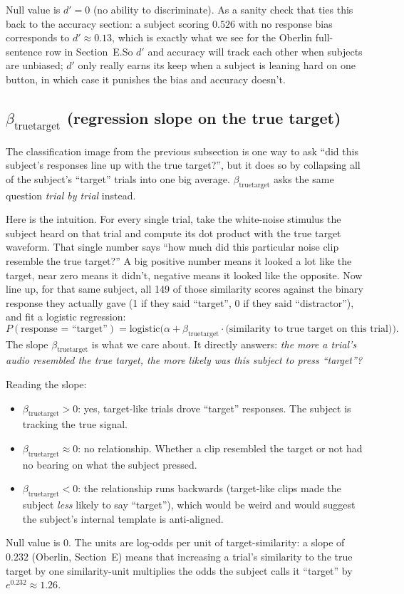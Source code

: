 \documentclass[11pt]{article}
\begin{document}
Null value is $d' = 0$ (no ability to discriminate). As a sanity check that ties this back to the accuracy section: a subject scoring $0.526$ with no response bias corresponds to $d' \approx 0.13$, which is exactly what we see for the Oberlin full-sentence row in Section~E.\@ So $d'$ and accuracy will track each other when subjects are unbiased; $d'$ only really earns its keep when a subject is leaning hard on one button, in which case it punishes the bias and accuracy doesn't.

\subsection{$\beta_{\text{truetarget}}$ (regression slope on the true target)}

The classification image from the previous subsection is one way to ask ``did this subject's responses line up with the true target?'', but it does so by collapsing all of the subject's ``target'' trials into one big average. $\beta_{\text{truetarget}}$ asks the same question \emph{trial by trial} instead.

Here is the intuition. For every single trial, take the white-noise stimulus the subject heard on that trial and compute its dot product with the true target waveform. That single number says ``how much did this particular noise clip resemble the true target?'' A big positive number means it looked a lot like the target, near zero means it didn't, negative means it looked like the opposite. Now line up, for that same subject, all 149 of those similarity scores against the binary response they actually gave (1 if they said ``target'', 0 if they said ``distractor''), and fit a logistic regression:
\[
P(\text{response = ``target''}) = \text{logistic}\bigl(\alpha + \beta_{\text{truetarget}} \cdot \text{(similarity to true target on this trial)}\bigr).
\]
The slope $\beta_{\text{truetarget}}$ is what we care about. It directly answers: \emph{the more a trial's audio resembled the true target, the more likely was this subject to press ``target''?}

Reading the slope:
\begin{itemize}
  \item $\beta_{\text{truetarget}} > 0$: yes, target-like trials drove ``target'' responses. The subject is tracking the true signal.
  \item $\beta_{\text{truetarget}} \approx 0$: no relationship. Whether a clip resembled the target or not had no bearing on what the subject pressed.
  \item $\beta_{\text{truetarget}} < 0$: the relationship runs backwards (target-like clips made the subject \emph{less} likely to say ``target''), which would be weird and would suggest the subject's internal template is anti-aligned.
\end{itemize}
Null value is $0$. The units are log-odds per unit of target-similarity: a slope of $0.232$ (Oberlin, Section~E) means that increasing a trial's similarity to the true target by one similarity-unit multiplies the odds the subject calls it ``target'' by $e^{0.232} \approx 1.26$.
\end{document}
